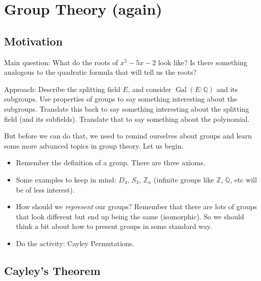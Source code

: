 \documentclass[12pt]{article}
\theoremstyle{plain}
\theoremstyle{definition}
\theoremstyle{remark}
\def\Z{\mathbb Z}
\def\Q{\mathbb Q}
\DeclareMathOperator{\Gal}{Gal}
\newcommand{\todayis}[1]{\clearpage{\rhead{\footnotesize #1}}}
\begin{document}
\todayis{Wednesday, February 20}

\section*{Group Theory (again)}

\subsection*{Motivation}

Main question: What do the roots of $x^5 - 5x - 2$ look like?  Is there something analogous to the quadratic formula that will tell us the roots?

Approach: Describe the splitting field $E$, and consider $\Gal(E:\Q)$ and its subgroups.  Use properties of groups to say something interesting about the subgroups.  Translate this back to say something interesting about the splitting field (and its subfields).  Translate that to say something about the polynomial.

But before we can do that, we need to remind ourselves about groups and learn some more advanced topics in group theory.  Let us begin.

\begin{itemize}
\item Remember the definition of a group.  There are three axioms.
\item Some examples to keep in mind: $D_4$, $S_3$, $\Z_n$ (infinite groups like $\Z$, $\Q$, etc will be of less interest).
\item How should we \emph{represent} our groups?  Remember that there are lots of groups that look different but end up being the same (isomorphic).  So we should think a bit about how to present groups in some standard way.
\item Do the activity: Cayley Permutations.
\end{itemize}


\subsection*{Cayley's Theorem}
\end{document}
